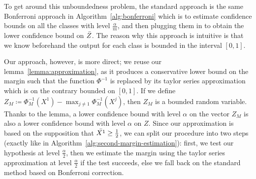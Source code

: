 To get around this unboundedness problem, the standard approach is the same Bonferroni approach in Algorithm~\ref{alg:bonferroni} which is to estimate confidence bounds on all the classes with level $\frac{\alpha}{m}$, and then plugging them in to obtain the lower confidence bound on $\Bar{Z}$.
The reason why this approach is intuitive is that we know beforehand the output for each class is bounded in the interval $[0,1]$.

Our approach, however, is more direct; we reuse our lemma~\ref{lemma:approximation}, as it produces a conservative lower bound on the margin such that the function $\Phi^{-1}$ is replaced by its taylor series approximation which is on the contrary bounded on $[0,1]$.
If we define $Z_M\coloneqq\Phi^{-1}_M(X^1)-\max_{j \neq 1}\Phi^{-1}_M(X^j)$, then $Z_M$ is a bounded random variable.
Thanks to the lemma, a lower confidence bound with level $\alpha$ on the vector $Z_M$ is also a lower confidence bound with level $\alpha$ on $Z$.
Since our approximation is based on the supposition that $\Bar{X^1}\geq\frac{1}{2}$, we can split our procedure into two steps (exactly like in Algorithm~\ref{alg:second-margin-estimation}): first, we test our hypothesis at level $\frac{\alpha}{2}$, then we estimate the margin using the taylor series approximation at level $\frac{\alpha}{2}$ if the test succeeds, else we fall back on the standard method based on Bonferroni correction.
